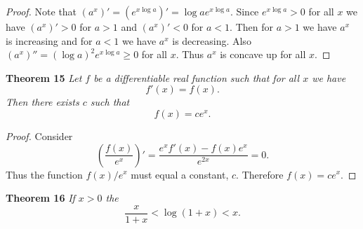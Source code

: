 \documentclass{article}
\begin{document}
\begin{flushleft}
\begin{proof}
Note that $(a^x)' = (e^{x \log a})' = \log a e^{x \log a}$. Since $e^{x \log a} > 0$ for all $x$ we have $(a^x)' > 0$ for $a > 1$ and $(a^x)' < 0$ for $a < 1$. Then for $a > 1$ we have $a^x$ is increasing and for $a < 1$ we have $a^x$ is decreasing. Also $(a^x)'' = (\log a)^2 e^{x \log a} \geq 0$ for all $x$. Thus $a^x$ is concave up for all $x$.
\end{proof}

\textbf{Theorem 15}
\textsl{Let $f$ be a differentiable real function such that for all $x$ we have
\[
f'(x) = f(x).
\]
Then there exists $c$ such that
\[
f(x) = c e^x.
\]}
\begin{proof}
Consider
\[
\left ( \frac{f(x)}{e^x} \right )' = \frac{e^x f'(x) - f(x) e^x}{e^{2x}} = 0.
\]
Thus the function $f(x)/e^x$ must equal a constant, $c$. Therefore $f(x) = c e^x$.
\end{proof}

\textbf{Theorem 16}
\textsl{If $x>0$ the
\[
\frac{x}{1+x} < \log (1+x) < x.
\]}

\end{flushleft}
\end{document}
